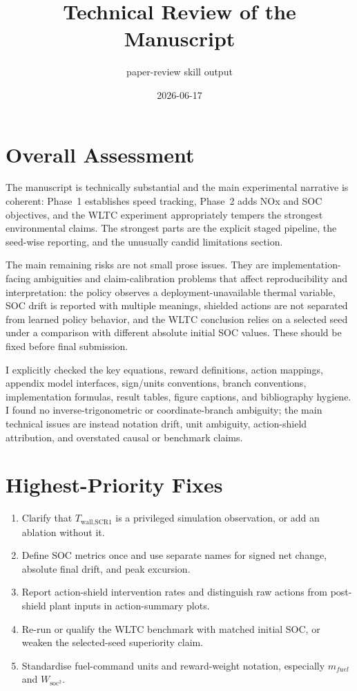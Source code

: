 \documentclass[11pt]{article}
\title{Technical Review of the Manuscript}
\author{paper-review skill output}
\date{2026-06-17}
\begin{document}
\maketitle

\section*{Overall Assessment}

The manuscript is technically substantial and the main experimental narrative is coherent: Phase~1 establishes speed tracking, Phase~2 adds NOx and SOC objectives, and the WLTC experiment appropriately tempers the strongest environmental claims. The strongest parts are the explicit staged pipeline, the seed-wise reporting, and the unusually candid limitations section.

The main remaining risks are not small prose issues. They are implementation-facing ambiguities and claim-calibration problems that affect reproducibility and interpretation: the policy observes a deployment-unavailable thermal variable, SOC drift is reported with multiple meanings, shielded actions are not separated from learned policy behavior, and the WLTC conclusion relies on a selected seed under a comparison with different absolute initial SOC values. These should be fixed before final submission.

I explicitly checked the key equations, reward definitions, action mappings, appendix model interfaces, sign/units conventions, branch conventions, implementation formulas, result tables, figure captions, and bibliography hygiene. I found no inverse-trigonometric or coordinate-branch ambiguity; the main technical issues are instead notation drift, unit ambiguity, action-shield attribution, and overstated causal or benchmark claims.

\section*{Highest-Priority Fixes}

\begin{enumerate}
  \item Clarify that \(T_{\text{wall,SCR1}}\) is a privileged simulation observation, or add an ablation without it.
  \item Define SOC metrics once and use separate names for signed net change, absolute final drift, and peak excursion.
  \item Report action-shield intervention rates and distinguish raw actions from post-shield plant inputs in action-summary plots.
  \item Re-run or qualify the WLTC benchmark with matched initial SOC, or weaken the selected-seed superiority claim.
  \item Standardise fuel-command units and reward-weight notation, especially \(m_{fuel}\) and \(W_{\text{soc}^2}\).
\end{enumerate}
\end{document}
